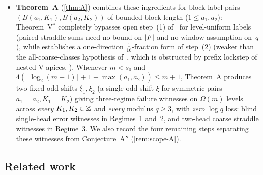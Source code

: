\begin{itemize}
  choices, and shows that the pure binary clock $B(\infty, 0)$ fails modulo every Mersenne number $q = 2^B - 1$ ($B \ge 2$)
  with straddle residue $q - 1$ at every third/periodic scale $B \mid (m - \kappa + 2)$.
\item \textbf{Theorem~A} (\cref{thm:A}) combines these ingredients for block-label pairs $(B(a_1, K_1),\allowbreak B(a_2, K_2))$ of
  bounded block length ($1 \le a_1, a_2$): Theorem~V$^*$ completely bypasses open step~(1) of~\cite[Section~5.6]{EighthPaper2026}
  for level-uniform labels (paired straddle sums need no bound on $\lvert F \rvert$ and no window assumption on~$q$), while
   establishes a one-direction $\tfrac{1}{16}$-fraction form of step~(2) (weaker than
  the all-coarse-classes hypothesis of~\cite[Proposition~5.23]{EighthPaper2026}, which is obstructed by prefix lockstep of
  nested V-apices, ). Whenever $m < s_0$ and
  $4(\lfloor \log_2(m+1)\rfloor + 1 + \max(a_1, a_2)) \le m + 1$, Theorem~A produces two fixed odd shifts $\xi_1, \xi_2$
  (a single odd shift $\xi$ for symmetric pairs $a_1 = a_2, K_1 = K_2$) giving three-regime failure witnesses on
  $\Omega(m)$ levels across \emph{every} $K_1, K_2 \in \mathbb{Z}$ and \emph{every} modulus $q \ge 3$, with \emph{zero} $\log q$
  loss: blind single-head error witnesses in Regimes~1 and~2, and two-head coarse straddle witnesses in Regime~3. We also
  record the four remaining steps separating these witnesses from Conjecture~A$''$ (\cref{rem:scope-A}).
\end{itemize}

\subsection{Related work}

